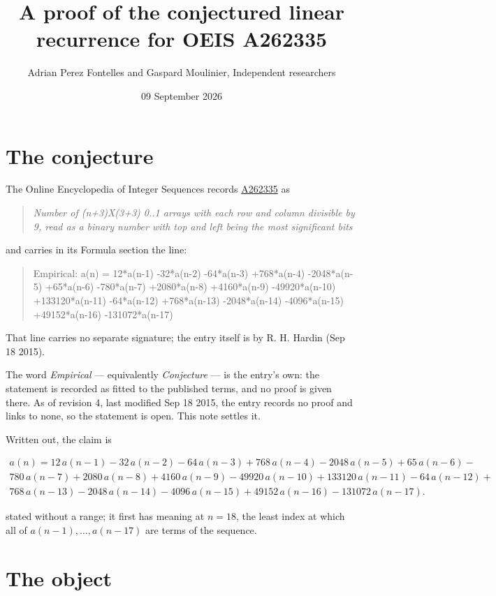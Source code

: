 \documentclass[11pt]{article}
\title{A proof of the conjectured linear recurrence for OEIS A262335}
\author{Adrian Perez Fontelles and Gaspard Moulinier, Independent researchers}
\date{09 September 2026}
\theoremstyle{definition}
\begin{document}
\maketitle
\section{The conjecture}

The Online Encyclopedia of Integer Sequences records \href{https://oeis.org/A262335}{A262335} as

\begin{quote}\itshape Number of (n+3)X(3+3) 0..1 arrays with each row and column divisible by 9, read as a binary number with top and left being the most significant bits\end{quote}

and carries in its Formula section the line:

\begin{quote}\ttfamily Empirical: a(n) = 12*a(n-1) -32*a(n-2) -64*a(n-3) +768*a(n-4) -2048*a(n-5) +65*a(n-6) -780*a(n-7) +2080*a(n-8) +4160*a(n-9) -49920*a(n-10) +133120*a(n-11) -64*a(n-12) +768*a(n-13) -2048*a(n-14) -4096*a(n-15) +49152*a(n-16) -131072*a(n-17)\end{quote}

That line carries no separate signature; the entry itself is by R. H. Hardin (Sep 18 2015).

The word {\itshape Empirical} --- equivalently {\itshape Conjecture} --- is the entry's own: the statement is recorded as fitted to the published terms, and no proof is given there. As of revision 4, last modified Sep 18 2015, the entry records no proof and links to none, so the statement is open. This note settles it.

Written out, the claim is

\begin{multline*} a(n) = 12\,a(n-1) - 32\,a(n-2) - 64\,a(n-3) + 768\,a(n-4) - 2048\,a(n-5) + 65\,a(n-6) - \\ 780\,a(n-7) + 2080\,a(n-8) + 4160\,a(n-9) - 49920\,a(n-10) + 133120\,a(n-11) - 64\,a(n-12) + \\ 768\,a(n-13) - 2048\,a(n-14) - 4096\,a(n-15) + 49152\,a(n-16) - 131072\,a(n-17). \end{multline*}

stated without a range; it first has meaning at $n = 18$, the least index at which all of $a(n-1),\dots,a(n-17)$ are terms of the sequence.

\section{The object}
\end{document}
